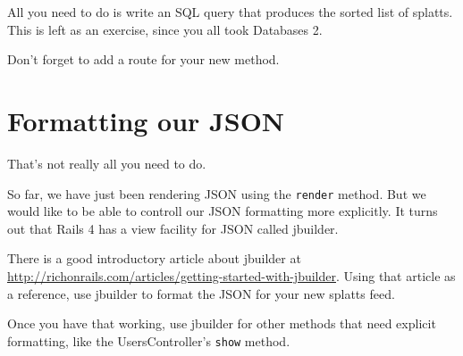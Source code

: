 \documentclass{article}
\begin{document}
All you need to do is write an SQL query that produces the sorted list of splatts.  This is left as an exercise, since you all took Databases 2.

Don't forget to add a route for your new method.

\section{Formatting our JSON}
That's not really all you need to do.

So far, we have just been rendering JSON using the \texttt{render} method.  But we would like to be able to controll our JSON formatting more explicitly.  It turns out that Rails 4 has a view facility for JSON called jbuilder.

There is a good introductory article about jbuilder at \url{http://richonrails.com/articles/getting-started-with-jbuilder}. Using that article as a reference, use jbuilder to format the JSON for your new splatts feed.

Once you have that working, use jbuilder for other methods that need explicit formatting, like the UsersController's \texttt{show} method.
\end{document}
